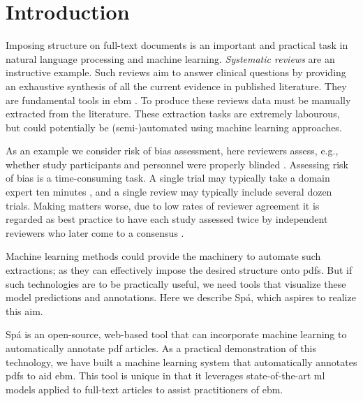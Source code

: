 \documentclass[runningheads,a4paper]{llncs}
\begin{document}
\acresetall
{}

\section{Introduction}
\label{section:intro}

Imposing structure on full-text documents is an important and practical task in natural language processing and machine learning.
\emph{Systematic reviews} are an instructive example.
Such reviews aim to answer clinical questions by providing an exhaustive synthesis of all the current evidence in published literature.
They are fundamental tools in \ac{ebm} \cite{Sackett1996,Valkenhoef2012}.
To produce these reviews data must be manually extracted from the literature.
These extraction tasks are extremely labourous, but could potentially be (semi-)automated using machine learning approaches.

As an example we consider risk of bias assessment, here reviewers assess, e.g., whether study participants and personnel were properly blinded \cite{Higgins2011}.
Assessing risk of bias is a time-consuming task.
A single trial may typically take a domain expert ten minutes \cite{Hartling2011}, and a single review may typically include several dozen trials.
Making matters worse, due to low rates of reviewer agreement it is regarded as best practice to have each study assessed twice by independent reviewers who later come to a consensus \cite{Hartling2009}.

Machine learning methods could provide the machinery to automate such extractions; as they can effectively impose the desired structure onto \acp{pdf}.
But if such technologies are to be practically useful, we need tools that visualize these model predictions and annotations.
Here we describe Spá, which aspires to realize this aim.

Spá is an open-source, web-based tool that can incorporate machine learning to automatically annotate \ac{pdf} articles.
As a practical demonstration of this technology, we have built a machine learning system that automatically annotates \acp{pdf} to aid \ac{ebm}.
This tool is unique in that it leverages state-of-the-art \ac{ml} models applied to full-text articles to assist practitioners of \ac{ebm}.
\end{document}
